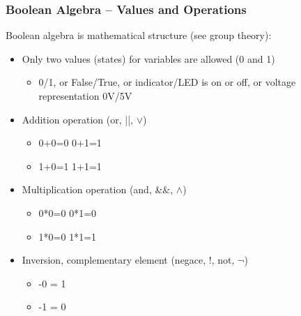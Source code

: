 \documentclass{beamer}
\begin{document}
\begin{frame}
\frametitle{Boolean Algebra -- Values and Operations}

Boolean algebra is mathematical structure (see group theory):
\begin{itemize}
\item Only two values (states) for variables are allowed (0 and 1)
\begin{itemize}
\item 0/1, or False/True, or indicator/LED is on or off, or voltage representation 0V/5V
\end{itemize}
\item Addition operation (or, ||, $\lor$)
\begin{itemize}
\item 0+0=0 \phantom{XXXX}  0+1=1
\item 1+0=1 \phantom{XXXX}  1+1=1
\end{itemize}
\item Multiplication operation (and, \&\&, $\land$)
\begin{itemize}
\item 0*0=0 \phantom{XXXX}  0*1=0
\item 1*0=0 \phantom{XXXX}  1*1=1
\end{itemize}
\item Inversion, complementary element (negace, !, not, $\neg$)
\begin{itemize}
\item -0 = 1
\item -1 = 0
\end{itemize}
\end{itemize}
\end{frame}
\end{document}

